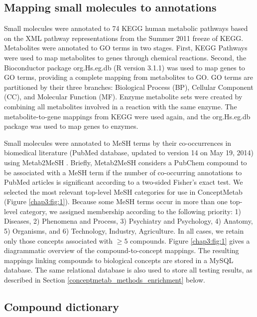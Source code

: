 \subsection{Mapping small molecules to annotations}
\label{conceptmetab_methods_mapping}

Small molecules were annotated to 74 KEGG human metabolic pathways based on the XML pathway representations from the Summer 2011 freeze of KEGG. Metabolites were annotated to GO terms in two stages. First, KEGG Pathways were used to map metabolites to genes through chemical reactions. Second, the Bioconductor package org.Hs.eg.db (R version 3.1.1) was used to map genes to GO terms, providing a complete mapping from metabolites to GO. GO terms are partitioned by their three branches: Biological Process (BP), Cellular Component (CC), and Molecular Function (MF). Enzyme metabolite sets were created by combining all metabolites involved in a reaction with the same enzyme. The metabolite-to-gene mappings from KEGG were used again, and the org.Hs.eg.db package was used to map genes to enzymes.

Small molecules were annotated to MeSH terms by their co-occurrences in biomedical literature (PubMed database, updated to version 14 on May 19, 2014) using Metab2MeSH \cite{Sartor:2012eb}. Briefly, Metab2MeSH considers a PubChem compound to be associated with a MeSH term if the number of co-occurring annotations to PubMed articles is significant according to a two-sided Fisher's exact test. We selected the most relevant top-level MeSH categories for use in ConceptMetab (Figure \ref{chap3:fig:1}). Because some MeSH terms occur in more than one top-level category, we assigned membership according to the following priority: 1) Diseases, 2) Phenomena and Process, 3) Psychiatry and Psychology, 4) Anatomy, 5) Organisms, and 6) Technology, Industry, Agriculture. In all cases, we retain only those concepts associated with $\geq 5$ compounds. Figure \ref{chap3:fig:1} gives a diagrammatic overview of the compound-to-concept mappings.
The resulting mappings linking compounds to biological concepts are stored in a MySQL database. The same relational database is also used to store all testing results, as described in Section \ref{conceptmetab_methods_enrichment} below.

\subsection{Compound dictionary}
\label{conceptmetab_methods_dictionary}

